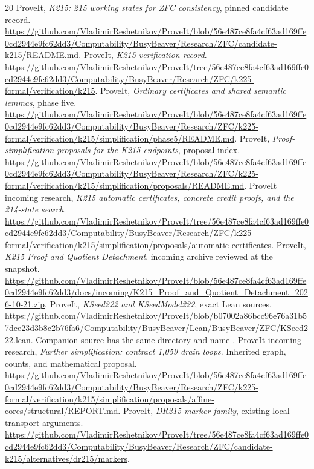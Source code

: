 \documentclass[11pt]{article}
\newcommand{\code}[1]{\texttt{\detokenize{#1}}}
\begin{document}
\begin{thebibliography}{20}\small
{} ProveIt, \emph{K215: 215 working states for ZFC consistency}, pinned candidate record. \url{https://github.com/VladimirReshetnikov/ProveIt/blob/56e487ce8fa4cf63ad169ffe0cd2944e9fc62dd3/Computability/BusyBeaver/Research/ZFC/candidate-k215/README.md}.
 ProveIt, \emph{K215 verification record}. \url{https://github.com/VladimirReshetnikov/ProveIt/tree/56e487ce8fa4cf63ad169ffe0cd2944e9fc62dd3/Computability/BusyBeaver/Research/ZFC/k225-formal/verification/k215}.
 ProveIt, \emph{Ordinary certificates and shared semantic lemmas}, phase five. \url{https://github.com/VladimirReshetnikov/ProveIt/blob/56e487ce8fa4cf63ad169ffe0cd2944e9fc62dd3/Computability/BusyBeaver/Research/ZFC/k225-formal/verification/k215/simplification/phase5/README.md}.
 ProveIt, \emph{Proof-simplification proposals for the K215 endpoints}, proposal index. \url{https://github.com/VladimirReshetnikov/ProveIt/blob/56e487ce8fa4cf63ad169ffe0cd2944e9fc62dd3/Computability/BusyBeaver/Research/ZFC/k225-formal/verification/k215/simplification/proposals/README.md}.
 ProveIt incoming research, \emph{K215 automatic certificates, concrete credit proofs, and the 214-state search}. \url{https://github.com/VladimirReshetnikov/ProveIt/tree/56e487ce8fa4cf63ad169ffe0cd2944e9fc62dd3/Computability/BusyBeaver/Research/ZFC/k225-formal/verification/k215/simplification/proposals/automatic-certificates}.
 ProveIt, \emph{K215 Proof and Quotient Detachment}, incoming archive reviewed at the snapshot. \url{https://github.com/VladimirReshetnikov/ProveIt/blob/56e487ce8fa4cf63ad169ffe0cd2944e9fc62dd3/docs/incoming/K215_Proof_and_Quotient_Detachment_2026-10-21.zip}.
 ProveIt, \emph{KSeed222 and KSeedModel222}, exact Lean sources. \url{https://github.com/VladimirReshetnikov/ProveIt/blob/b07002a86bcc96e76a31b57dce23d3b8c2b76fa6/Computability/BusyBeaver/Lean/BusyBeaver/ZFC/KSeed222.lean}. Companion source has the same directory and name \code{KSeedModel222.lean}.
 ProveIt incoming research, \emph{Further simplification: contract 1,059 drain loops}. Inherited graph, counts, and mathematical proposal. \url{https://github.com/VladimirReshetnikov/ProveIt/blob/56e487ce8fa4cf63ad169ffe0cd2944e9fc62dd3/Computability/BusyBeaver/Research/ZFC/k225-formal/verification/k215/simplification/proposals/affine-cores/structural/REPORT.md}.
 ProveIt, \emph{DR215 marker family}, existing local transport arguments. \url{https://github.com/VladimirReshetnikov/ProveIt/tree/56e487ce8fa4cf63ad169ffe0cd2944e9fc62dd3/Computability/BusyBeaver/Research/ZFC/candidate-k215/alternatives/dr215/markers}.

\end{thebibliography}
\end{document}
